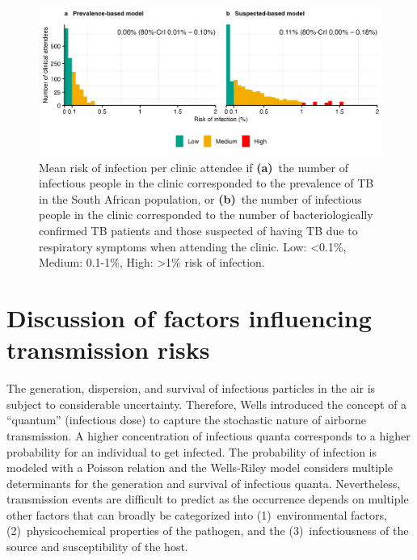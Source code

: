 \documentclass[fleqn,11pt]{wlscirep_supp}
\begin{document}
\begin{figure}[!htpb]
    \centering
    \includegraphics{results/modeling/mean-roi-assumptions.png}
    \caption[Mean risk of infection per clinic attendee when varying assumptions about the number of infectious people in the clinic]{Mean risk of infection per clinic attendee if \textbf{(a)}~the number of infectious people in the clinic corresponded to the prevalence of TB in the South African population, or \textbf{(b)}~the number of infectious people in the clinic corresponded to the number of bacteriologically confirmed TB patients and those suspected of having TB due to respiratory symptoms when attending the clinic. Low: <0.1\%, Medium: 0.1-1\%, High: >1\% risk of infection.}
    \label{fig:assumptions-results}
\end{figure}

\clearpage

\section{Discussion of factors influencing transmission risks}\label{sec:depth-discussion}

The generation, dispersion, and survival of infectious particles in the air is subject to considerable uncertainty. Therefore, Wells\cite{Wells1955} introduced the concept of a ``quantum'' (infectious dose) to capture the stochastic nature of airborne transmission. A higher concentration of infectious quanta corresponds to a higher probability for an individual to get infected. The probability of infection is modeled with a Poisson relation and the Wells-Riley model considers multiple determinants for the generation and survival of infectious quanta. Nevertheless, transmission events are difficult to predict as the occurrence depends on multiple other factors that can broadly be categorized into (1)~environmental factors, (2)~physicochemical properties of the pathogen, and the (3)~infectiousness of the source and susceptibility of the host. 
\end{document}
